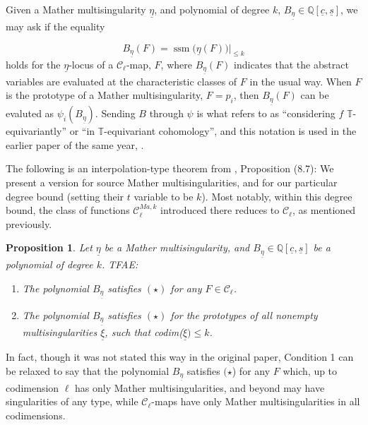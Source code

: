 \documentclass[11pt]{article}
\theoremstyle{plain}
\newtheorem{proposition}[fact]{Proposition}
\theoremstyle{definition}
\theoremstyle{definition}
\newcounter{equation}
\newcommand{\bb}[1]{\mathbb{#1}}
\DeclareMathOperator{\ssm}{ssm}
\begin{document}
Given a Mather multisingularity $\underline\eta$, and polynomial of degree $k$, $B_{\underline\eta}\in \mathbb Q[\underline c, \underline s]$, we may ask if the equality

\begin{equation}\label{star}\tag{$\star$}
    B_{\underline\eta}(F)=\ssm\big(\underline{\eta}(F)\big)\big|_{\leq k}
\end{equation}
holds for the $\underline{\eta}$-locus of a $\mathcal C_\ell$-map, $F$, where $B_{\underline \eta}(F)$ indicates that the abstract variables are evaluated at the characteristic classes of $F$ in the usual way. When $F$ is the prototype of a Mather multisingularity, $F=p_i$, then $B_{\underline\eta}(F)$ can be evaluted as $\psi_i(B_{\underline\eta})$. Sending $B$ through $\psi$ is what \cite{rimanyi} refers to as ``considering $f$ $\bb T$-equivariantly'' or ``in $\bb T$-equivariant cohomology'', and this notation is used in the earlier paper of the same year, \cite{rimanyi2025interpolationcharacterizationhigherthom}.  

The following is an interpolation-type theorem from \cite{rimanyi}, Proposition (8.7): We present a version for source Mather multisingularities, and for our particular degree bound (setting their $t$ variable to be $k$). Most notably, within this degree bound, the class of functions $\mathcal C^{Ma,k}_\ell$ introduced there reduces to $\mathcal C_\ell$, as mentioned previously. 

\begin{proposition}\label{thm-interpolation}
    Let $\underline{\eta}$ be a Mather multisingularity, and $B_{\underline{\eta}}\in \bb Q[\underline c,\underline s]$ be a polynomial of degree $k$. TFAE:
    \begin{enumerate}
        \item The polynomial $B_{\underline \eta}$ satisfies $(\star)$ for any $F \in \mathcal C_\ell$.
        \item The polynomial $B_{\underline \eta}$ satisfies $(\star)$ for the prototypes of all nonempty multisingularities $\underline{\xi}$, such that
codim($\underline{\xi}) \leq k$.
    \end{enumerate}
\end{proposition}

In fact, though it was not stated this way in the original paper, Condition 1 can be relaxed to say that the polynomial $B_{\underline\eta}$ satisfies $(\star$) for any $F$ which, up to codimension $\ell$ has only Mather multisingularities, and beyond may have singularities of any type, while $\mathcal C_\ell$-maps have only Mather multisingularities in all codimensions. 
\end{document}
